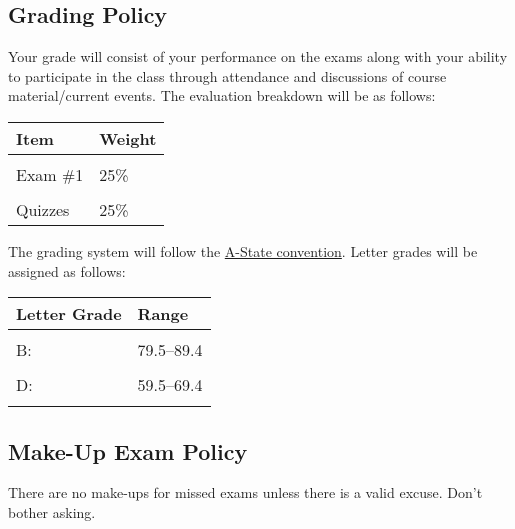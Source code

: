 \documentclass[11pt,]{article}
\begin{document}
\hypertarget{grading-policy}{%
\subsection{Grading Policy}\label{grading-policy}}

Your grade will consist of your performance on the exams along with your
ability to participate in the class through attendance and discussions
of course material/current events. The evaluation breakdown will be as
follows:

\begin{table}[H]
\centering
\begin{tabular}{ll}
\toprule
Item & Weight\\
\midrule
\cellcolor{gray!6}{Discussion} & \cellcolor{gray!6}{25\%}\\
Exam \#1 & 25\%\\
\cellcolor{gray!6}{Exam \#2} & \cellcolor{gray!6}{25\%}\\
Quizzes & 25\%\\
\bottomrule
\end{tabular}
\end{table}

The grading system will follow the
\href{https://www.astate.edu/college/graduate-school/academic-policies/}{A-State
convention}. Letter grades will be assigned as follows:

\begin{table}[H]
\centering
\begin{tabular}{ll}
\toprule
Letter Grade & Range\\
\midrule
\cellcolor{gray!6}{A:} & \cellcolor{gray!6}{89.5–100}\\
B: & 79.5–89.4\\
\cellcolor{gray!6}{C:} & \cellcolor{gray!6}{69.5–79.4}\\
D: & 59.5–69.4\\
\cellcolor{gray!6}{F:} & \cellcolor{gray!6}{00.0-59.4}\\
\bottomrule
\end{tabular}
\end{table}

\hypertarget{make-up-exam-policy}{%
\subsection{Make-Up Exam Policy}\label{make-up-exam-policy}}

There are no make-ups for missed exams unless there is a valid excuse.
Don't bother asking.
\end{document}
